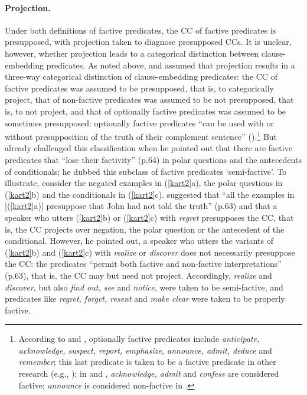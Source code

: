 \documentclass[11pt,fleqn]{article}
\newcommand{\6}{\mbox{$[\hspace*{-.6mm}[$}}
\newcommand{\9}{\mbox{$]\hspace*{-.6mm}]$}}
\begin{document}
\paragraph{Projection.} Under both definitions of factive predicates, the CC of factive predicates is presupposed, with projection taken to diagnose presupposed CCs. It is unclear, however, whether projection leads to a categorical distinction between clause-embedding predicates. As noted above, \citet{kiparsky-kiparsky70} and \citet{karttunen71-implicative} assumed that projection results in a three-way categorical distinction of clause-embedding predicates:  the CC of factive predicates was assumed to be presupposed, that is, to categorically project, that of non-factive predicates was assumed to be not presupposed, that is, to not project, and that of optionally factive predicates was assumed to be sometimes presupposed: optionally factive predicates ``can be used with or without presupposition of the truth of their complement sentence'' (\citealt[340]{karttunen71-implicative}).\footnote{According to \citet{kiparsky-kiparsky70} and \citet{karttunen71-implicative}, optionally factive predicates include {\em anticipate, acknowledge, suspect, report, emphasize, announce, admit, deduce} and {\em remember}; this last predicate is taken to be a factive predicate in other research (e.g., \citealt{simons07,kastner2015,abrusan2016,karttunen2016,aravind-hackl2017,cremers2018}); in \citealt{karttunen-zaenen2005} and \citealt{karttunen2016}, {\em acknowledge, admit} and {\em confess} are considered factive; {\em announce} is considered non-factive in \citealt{karttunen-zaenen2005}.} But \citet{karttunen71b} already challenged this classification when he pointed out that there are factive predicates that ``lose their factivity'' (p.64) in polar questions and the antecedents of conditionals; he dubbed this subclass of factive predicates `semi-factive'. To illustrate, consider the negated examples in (\ref{kart2}a), the polar questions in (\ref{kart2}b) and the conditionals in (\ref{kart2}c). \citet{karttunen71b} suggested that ``all the examples in [(\ref{kart2}a)] presuppose that John had not told the truth'' (p.63) and that a speaker who utters (\ref{kart2}b) or (\ref{kart2}c) with {\em regret} presupposes the CC, that is, the CC projects over negation, the polar question or  the antecedent of the conditional. However, he pointed out, a speaker who utters the variants of (\ref{kart2}b) and (\ref{kart2}c) with {\em realize} or {\em discover} does not necessarily presuppose the CC: the predicates ``permit both factive and non-factive interpretations'' (p.63), that is, the CC may but need not project. Accordingly, {\em realize} and {\em discover}, but also {\em find out, see} and {\em notice}, were taken to be semi-factive, and predicates like {\em regret, forget, resent} and {\em make clear}  were taken to be properly factive.
\end{document}
